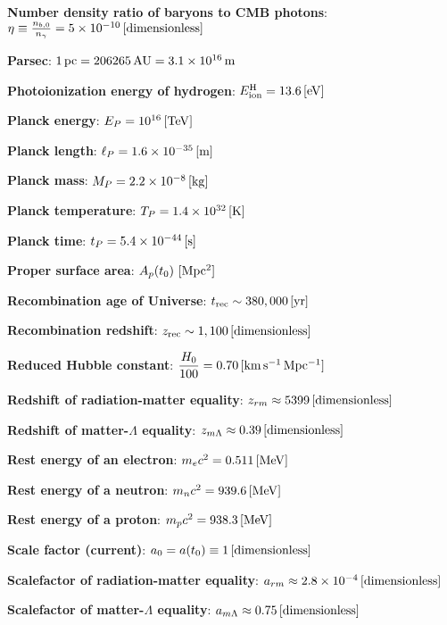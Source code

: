 \documentclass[a4paper,11pt]{article}
\begin{document}
{\noindent}\textbf{Number density ratio of baryons to CMB photons}: $\eta \equiv \frac{n_{b,0}}{n_\gamma} = 5\times10^{-10}\,[{\rm dimensionless}]$

{\noindent}\textbf{Parsec}: $1\,{\rm pc} = 206265\,{\rm AU} = 3.1\times10^{16}\,{\rm m}$

{\noindent}\textbf{Photoionization energy of hydrogen}: $E^\mathrm{H}_\mathrm{ion} = 13.6\,[{\rm eV}]$

{\noindent}\textbf{Planck energy}: $E_P = 10^{16}\,[{\rm TeV}]$

{\noindent}\textbf{Planck length}: $\ell_P = 1.6\times10^{-35}\,[{\rm m}]$

{\noindent}\textbf{Planck mass}: $M_P = 2.2\times10^{-8}\,[{\rm kg}]$

{\noindent}\textbf{Planck temperature}: $T_P = 1.4\times10^{32}\,[{\rm K}]$

{\noindent}\textbf{Planck time}: $t_P = 5.4\times10^{-44}\,[{\rm s}]$

{\noindent}\textbf{Proper surface area}: $A_p(t_0) ~ [{\rm Mpc^2}]$

{\noindent}\textbf{Recombination age of Universe}: $t_\mathrm{rec} \sim 380,000\,[{\rm yr}]$

{\noindent}\textbf{Recombination redshift}: $z_\mathrm{rec}\sim1,100\,[{\rm dimensionless}]$

{\noindent}\textbf{Reduced Hubble constant}: $\dfrac{H_0}{100} = 0.70\,[{\rm km\,s^{-1}\,Mpc^{-1}}]$

{\noindent}\textbf{Redshift of radiation-matter equality}: $z_{rm} \approx 5399\,[{\rm dimensionless}]$

{\noindent}\textbf{Redshift of matter-$\Lambda$ equality}: $z_{m\Lambda}
\approx0.39\,[{\rm dimensionless}]$

{\noindent}\textbf{Rest energy of an electron}: $m_ec^2 = 0.511\,[{\rm MeV}]$

{\noindent}\textbf{Rest energy of a neutron}: $m_nc^2 = 939.6\,[{\rm MeV}]$

{\noindent}\textbf{Rest energy of a proton}: $m_pc^2 = 938.3\,[{\rm MeV}]$

{\noindent}\textbf{Scale factor (current)}: $a_0=a(t_0)\equiv1\,[{\rm dimensionless}]$

{\noindent}\textbf{Scalefactor of radiation-matter equality}: $a_{rm} \approx 2.8\times10^{-4}\,[{\rm dimensionless}]$

{\noindent}\textbf{Scalefactor of matter-$\Lambda$ equality}: $a_{m\Lambda}
\approx0.75\,[{\rm dimensionless}]$
\end{document}
